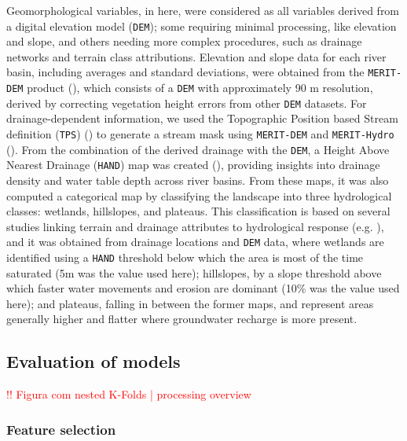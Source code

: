 \documentclass[12pt]{article}
\begin{document}
\par Geomorphological variables, in here, were considered as all variables derived from a digital elevation model (\texttt{DEM}); some requiring minimal processing, like elevation and slope, and others needing more complex procedures, such as drainage networks and terrain class attributions. Elevation and slope data for each river basin, including averages and standard deviations, were obtained from the \texttt{MERIT-DEM} product (\cite{yamazaki2017}), which consists of a \texttt{DEM} with approximately 90 m resolution, derived by correcting vegetation height errors from other \texttt{DEM} datasets. For drainage-dependent information, we used the Topographic Position based Stream definition (\texttt{TPS}) (\cite{barbedo2022b}) to generate a stream mask using \texttt{MERIT-DEM} and \texttt{MERIT-Hydro} (\cite{yamazaki2019}). From the combination of the derived drainage with the \texttt{DEM}, a Height Above Nearest Drainage (\texttt{HAND}) map was created (\cite{nobre2011, renno2008}), providing insights into drainage density and water table depth across river basins. From these maps, it was also computed a categorical map by classifying the landscape into three hydrological classes: wetlands, hillslopes, and plateaus. This classification is based on several studies linking terrain and drainage attributes to hydrological response (e.g. \cite{gao2014, gharari2011, savenije2010}), and it was obtained from drainage locations and \texttt{DEM} data, where wetlands are identified using a \texttt{HAND} threshold below which the area is most of the time saturated (5m was the value used here); hillslopes, by a slope threshold above which faster water movements and erosion are dominant (10\% was the value used here); and plateaus, falling in between the former maps, and represent areas generally higher and flatter where groundwater recharge is more present.

\subsection{Evaluation of models} \label{sec:datagen:proceval}

\par \textcolor{red}{!! Figura com nested K-Folds | processing overview}


\subsubsection{Feature selection} \label{sec:datagen:proceval:selection}
\end{document}
